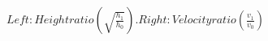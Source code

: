 \documentclass[preview]{standalone}
\begin{document}
\begin{align*}
Left: Height ratio (\sqrt{\frac{h_1}{h_0}}). Right: Velocity ratio (\frac{v_1}{v_0})
\end{align*}
\end{document}
